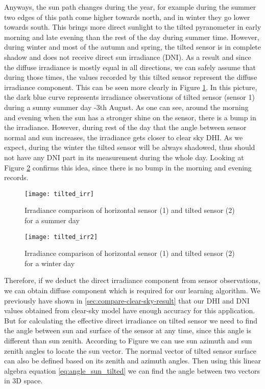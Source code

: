 Anyways, the sun path changes during the year, for example during the summer two edges of this path come higher towards north, and in winter they go lower towards south. This brings more direct sunlight to the tilted pyranometer in early morning and late evening than the rest of the day during summer time. However, during winter and most of the autumn and spring, the tilted sensor is in complete shadow and does not receive direct sun irradiance (DNI). As a result and since the diffuse irradiance is mostly equal in all directions, we can safely assume that during those times, the values recorded by this tilted sensor represent the diffuse irradiance component. This can be seen more clearly in Figure \ref{fig:tilted_irr_cmp}. In this picture, the dark blue curve represents irradiance observations of tilted sensor (sensor 1) during a sunny summer day -3th August. As one can see, around the morning and evening when the sun has a stronger shine on the sensor, there is a bump in the irradiance. However, during rest of the day that the angle between sensor normal and sun increases, the irradiance gets closer to clear sky DHI. As we expect, during the winter the tilted sensor will be always shadowed, thus should not have any DNI part in its measurement during the whole day. Looking at Figure \ref{fig:tilted_irr_cmp2} confirms this idea, since there is no bump in the morning and evening records.

\begin{figure}[h]
\caption{Irradiance comparison of horizontal sensor (1) and tilted sensor (2) for a summer day}
\label{fig:tilted_irr_cmp}
\texttt{[image: tilted\_irr]}
\centering
\end{figure}

\begin{figure}[h]
\caption{Irradiance comparison of horizontal sensor (1) and tilted sensor (2) for a winter day}
\label{fig:tilted_irr_cmp2}
\texttt{[image: tilted\_irr2]}
\centering
\end{figure}

Therefore, if we deduct the direct irradiance component from sensor observations, we can obtain diffuse component which is required for our learning algorithm. We previously have shown in \ref{sec:compare-clear-sky-result} that our DHI and DNI values obtained from clear-sky model have enough accuracy for this application. But for calculating the effective direct irradiance on tilted sensor we need to find the angle between sun and surface of the sensor at any time, since this angle is different than sun zenith. According to Figure we can use sun azimuth and sun zenith angles to locate the sun vector. The normal vector of tilted sensor surface can also be defined based on its zenith and azimuth angles. Then using this linear algebra equation \ref{eq:angle_sun_tilted} we can find the angle between two vectors in 3D space.


